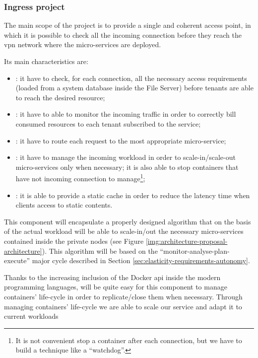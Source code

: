 \subsubsection{Ingress project}
\label{sec:architecture-proposal-architecture-ingress}
The main scope of the project is to provide a single and coherent access point, in which it is possible
to check all the incoming connection before they reach the \ac{vpn} network where the micro-services are
deployed.

Its main characteristics are:

\begin{itemize}
	\item{: it have to check, for each connection, all the necessary
		access requirements (loaded from a system database inside the File Server) before tenants are able
		to reach the desired resource;}
	\item{: it have to able to monitor the incoming traffic in order to correctly bill
		consumed resources to each tenant subscribed to the service;}
	\item{: it have to route each request to the most appropriate micro-service;}
	\item{: it have to manage the incoming workload in order to scale-in/scale-out
		micro-services only when necessary; it is also able to stop containers that have not incoming connection
		to manage\footnote{It is not convenient stop a container after each connection, but we have to build a
		technique like a ``watchdog''.};}
	\item{: it is able to provide a static cache in order to reduce the latency time
		when clients access to static contents.}
\end{itemize}

This component will encapsulate a properly designed algorithm that on the basis of the actual workload
will be able to scale-in/out the necessary micro-services contained inside the private nodes (see Figure
\ref{img:architecture-proposal-architecture}). This algorithm will be based on the 
``monitor-analyse-plan-execute'' major cycle described in Section \ref{sec:elasticity-requirements-autonomy}.

Thanks to the increasing inclusion of the Docker \acs{api} inside the modern programming languages, will be
quite easy for this component to manage containers' life-cycle in order to replicate/close them when necessary.
Through managing containers' life-cycle we are able to scale our service and adapt it to current workloads

